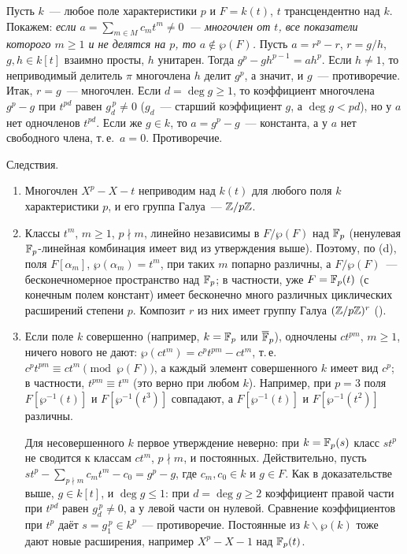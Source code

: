 \begin{example}
Пусть $k$~--- любое поле характеристики $p$ и $F=k(t)$, $t$ трансцендентно над $k$. Покажем: \emph{если
$a=\sum_{m\in M}c_mt^m\ne0$~--- многочлен от $t$, все показатели которого $m\ge1$ и не делятся на $p$, то
$a\notin\wp(F)$.} Пусть $a=r^p-r$, $r=g/h$, $g,h\in k[t]$ взаимно просты, $h$ унитарен. Тогда $g^p-gh^{p-1}=ah^p$. Если
$h\ne1$, то неприводимый делитель $\pi$ многочлена $h$ делит $g^p$, а значит, и $g$~--- противоречие. Итак, $r=g$~---
многочлен. Если $d=\deg g\ge1$, то коэффициент многочлена $g^p-g$ при $t^{pd}$ равен $g_d^{\,p}\ne0$ ($g_d$~--- старший
коэффициент $g$, а $\deg g<pd$), но у $a$ нет одночленов $t^{pd}$. Если же $g\in k$, то $a=g^p-g$~--- константа, а у $a$
нет свободного члена, т.\,е.\ $a=0$. Противоречие.

Следствия.
\begin{enumerate}[label=\textup{(\alph*)}]
\item Многочлен $X^p-X-t$ неприводим над $k(t)$ для любого поля $k$ характеристики $p$, и его группа Галуа~--- $\mathbb Z/p\mathbb Z$.
\item Классы $t^m$, $m\ge1$, $p\nmid m$, линейно независимы в $F/\wp(F)$ над $\mathbb F_p$ (ненулевая $\mathbb F_p$-линейная комбинация
имеет вид из утверждения выше). Поэтому, по (d), поля $F[\alpha_m]$, $\wp(\alpha_m)=t^m$, при таких $m$ попарно
различны, а $F/\wp(F)$~--- бесконечномерное пространство над $\mathbb F_p$; в частности, уже $F=\mathbb F_p(t)$ (с конечным полем
констант) имеет бесконечно много различных циклических расширений степени $p$. Композит $r$ из них имеет группу Галуа
$(\mathbb Z/p\mathbb Z)^r$ ().
\item Если поле $k$ совершенно (например, $k=\mathbb F_p$ или $\overline{\mathbb F}_p$), одночлены $ct^{pm}$, $m\ge1$, ничего нового не дают:
$\wp(ct^m)=c^pt^{pm}-ct^m$, т.\,е.\ $c^pt^{pm}\equiv ct^m\pmod{\wp(F)}$, а каждый элемент совершенного $k$ имеет вид $c^p$;
в частности, $t^{pm}\equiv t^m$ (это верно при любом $k$). Например, при $p=3$ поля $F[\wp^{-1}(t)]$ и
$F[\wp^{-1}(t^3)]$ совпадают, а $F[\wp^{-1}(t)]$ и $F[\wp^{-1}(t^2)]$ различны.

Для несовершенного $k$ первое утверждение неверно: при $k=\mathbb F_p(s)$ класс $st^p$ не сводится к классам $ct^m$, $p\nmid m$,
и постоянных. Действительно, пусть $st^p-\sum_{p\nmid m}c_mt^m-c_0=g^p-g$, где $c_m,c_0\in k$ и $g\in F$. Как в
доказательстве выше, $g\in k[t]$, и $\deg g\le1$: при $d=\deg g\ge2$ коэффициент правой части при $t^{pd}$ равен
$g_d^{\,p}\ne0$, а у левой части он нулевой. Сравнение коэффициентов при $t^p$ даёт $s=g_1^{\,p}\in k^p$~---
противоречие. Постоянные из $k\smallsetminus\wp(k)$ тоже дают новые расширения, например $X^p-X-1$ над $\mathbb F_p(t)$.
\end{enumerate}
\end{example}

